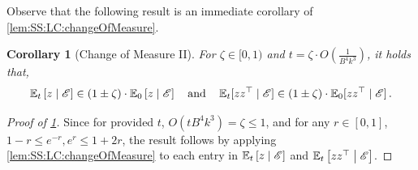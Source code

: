 \documentclass[11pt,letterpaper]{article}
\theoremstyle{plain}
\newtheorem{corollary}[theorem]{Corollary}
\theoremstyle{definition}
\theoremstyle{remark}
\newcommand{\quadtext}[1]{\quad\text{#1}\quad}
\newcommand{\quadand}{\quadtext{and}}
\newcommand{\given}{\;\middle|\;}
\newcommand{\sinsquare}[1]{\ensuremath{[#1]}}
\newcommand{\inparen}[1]{\ensuremath{\left(#1\right)}}
\newcommand{\insquare}[1]{\ensuremath{\left[#1\right]}}
\newcommand{\evE}{\ensuremath{\mathscr{E}}}
\newcommand{\E}{\operatornamewithlimits{\mathbb{E}}}
\newcommand{\Ex}{\E}
\begin{document}
{{        Observe that the following result is an immediate corollary of  \cref{lem:SS:LC:changeOfMeasure}.
        \begin{corollary}[Change of Measure II]\label{lem:SS:LC:changeOfMeasure:corr}
            For $\zeta\in [0,1)$ and $t=\zeta\cdot O\inparen{\frac{1}{B^4k^3}}$, it holds that,
            \[
                \Ex\nolimits_{t}\insquare{z\given \evE}
                \in 
                    \inparen{1\pm \zeta} 
                    \cdot 
                    \Ex\nolimits_{0}\insquare{z\given \evE}
                \quadand
                \Ex\nolimits_{t}\sinsquare{zz^\top \mid  \evE}
                \in 
                    \inparen{1\pm \zeta} 
                    \cdot 
                    \Ex\nolimits_{0}\sinsquare{zz^\top \mid \evE}
                \,.
            \]
        \end{corollary}
        \begin{proof}[Proof of \cref{lem:SS:LC:changeOfMeasure:corr}]
            Since for provided $t$, $O(tB^4k^3)=\zeta\leq 1$, and for any $r\in [0,1]$, $1-r\leq e^{-r}, e^r\leq 1+2r$, the result follows by applying  \cref{lem:SS:LC:changeOfMeasure} to each entry in $\Ex\nolimits_{t}\insquare{z\given \evE}$ and $\Ex\nolimits_{t}\insquare{zz^\top\given \evE}$.
        \end{proof}

}}
\end{document}
